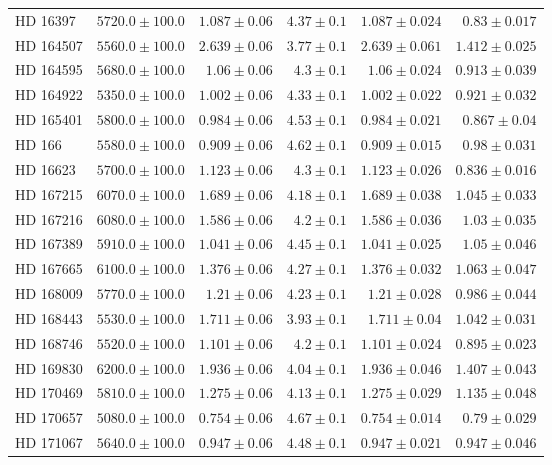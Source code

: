 \begin{longtable*}{lrrrrr}
HD 16397 & $5720.0\pm 100.0$ & $1.087\pm 0.06$ & $4.37\pm 0.1$ & $1.087\pm 0.024$ & $0.83\pm 0.017$ \\ 
HD 164507 & $5560.0\pm 100.0$ & $2.639\pm 0.06$ & $3.77\pm 0.1$ & $2.639\pm 0.061$ & $1.412\pm 0.025$ \\ 
HD 164595 & $5680.0\pm 100.0$ & $1.06\pm 0.06$ & $4.3\pm 0.1$ & $1.06\pm 0.024$ & $0.913\pm 0.039$ \\ 
HD 164922 & $5350.0\pm 100.0$ & $1.002\pm 0.06$ & $4.33\pm 0.1$ & $1.002\pm 0.022$ & $0.921\pm 0.032$ \\ 
HD 165401 & $5800.0\pm 100.0$ & $0.984\pm 0.06$ & $4.53\pm 0.1$ & $0.984\pm 0.021$ & $0.867\pm 0.04$ \\ 
HD 166 & $5580.0\pm 100.0$ & $0.909\pm 0.06$ & $4.62\pm 0.1$ & $0.909\pm 0.015$ & $0.98\pm 0.031$ \\ 
HD 16623 & $5700.0\pm 100.0$ & $1.123\pm 0.06$ & $4.3\pm 0.1$ & $1.123\pm 0.026$ & $0.836\pm 0.016$ \\ 
HD 167215 & $6070.0\pm 100.0$ & $1.689\pm 0.06$ & $4.18\pm 0.1$ & $1.689\pm 0.038$ & $1.045\pm 0.033$ \\ 
HD 167216 & $6080.0\pm 100.0$ & $1.586\pm 0.06$ & $4.2\pm 0.1$ & $1.586\pm 0.036$ & $1.03\pm 0.035$ \\ 
HD 167389 & $5910.0\pm 100.0$ & $1.041\pm 0.06$ & $4.45\pm 0.1$ & $1.041\pm 0.025$ & $1.05\pm 0.046$ \\ 
HD 167665 & $6100.0\pm 100.0$ & $1.376\pm 0.06$ & $4.27\pm 0.1$ & $1.376\pm 0.032$ & $1.063\pm 0.047$ \\ 
HD 168009 & $5770.0\pm 100.0$ & $1.21\pm 0.06$ & $4.23\pm 0.1$ & $1.21\pm 0.028$ & $0.986\pm 0.044$ \\ 
HD 168443 & $5530.0\pm 100.0$ & $1.711\pm 0.06$ & $3.93\pm 0.1$ & $1.711\pm 0.04$ & $1.042\pm 0.031$ \\ 
HD 168746 & $5520.0\pm 100.0$ & $1.101\pm 0.06$ & $4.2\pm 0.1$ & $1.101\pm 0.024$ & $0.895\pm 0.023$ \\ 
HD 169830 & $6200.0\pm 100.0$ & $1.936\pm 0.06$ & $4.04\pm 0.1$ & $1.936\pm 0.046$ & $1.407\pm 0.043$ \\ 
HD 170469 & $5810.0\pm 100.0$ & $1.275\pm 0.06$ & $4.13\pm 0.1$ & $1.275\pm 0.029$ & $1.135\pm 0.048$ \\ 
HD 170657 & $5080.0\pm 100.0$ & $0.754\pm 0.06$ & $4.67\pm 0.1$ & $0.754\pm 0.014$ & $0.79\pm 0.029$ \\ 
HD 171067 & $5640.0\pm 100.0$ & $0.947\pm 0.06$ & $4.48\pm 0.1$ & $0.947\pm 0.021$ & $0.947\pm 0.046$ \\ 

\end{longtable*}
